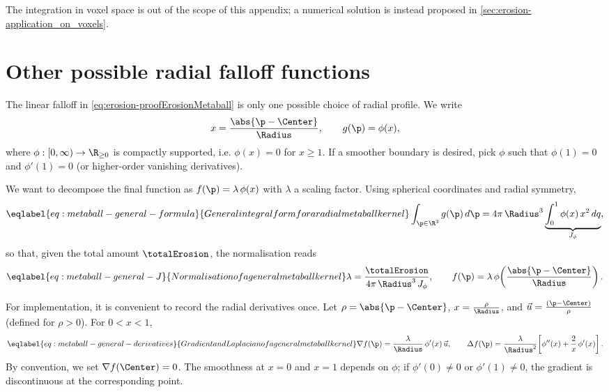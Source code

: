 The integration in voxel space is out of the scope of this appendix; a numerical solution is instead proposed in \cref{sec:erosion-application_on_voxels}.


\section{Other possible radial falloff functions}
\label{sec:erosion-appendix-other-falloffs}

The linear falloff in \cref{eq:erosion-proofErosionMetaball} is only one possible choice of radial profile. We write
\begin{align*}
    x = \frac{\abs{\p - \Center}}{\Radius}, \qquad
    g(\p) = \phi(x),
\end{align*}
where $\phi: [0,\infty) \to \R_{\ge 0}$ is compactly supported, i.e. $\phi(x) = 0$ for $x \ge 1$. If a smoother boundary is desired, pick $\phi$ such that $\phi(1) = 0$ and $\phi'(1) = 0$ (or higher-order vanishing derivatives).

We want to decompose the final function as $f(\p) = \lambda\,\phi(x)$ with $\lambda$ a scaling factor. Using spherical coordinates and radial symmetry,
\begin{align}
    \eqlabel{eq:metaball-general-formula}{General integral form for a radial metaball kernel}
    \int_{\p\in\R^3} g(\p)\,d\p
    = 4\pi\,\Radius^3 \underbrace{\int_{0}^{1} \phi(x)\,x^2\,dq}_{J_\phi},
\end{align}
so that, given the total amount $\totalErosion$, the normalisation reads
\begin{align}
    \eqlabel{eq:metaball-general-J}{Normalisation of a general metaball kernel}
    \lambda = \frac{\totalErosion}{4\pi\,\Radius^3\,J_\phi},
    \qquad
    f(\p) = \lambda\,\phi\!\left(\frac{\abs{\p - \Center}}{\Radius}\right).
\end{align}

For implementation, it is convenient to record the radial derivatives once. Let $\rho=\abs{\p - \Center}$, $x=\frac{\rho}{\Radius}$, and $\vec{u}=\frac{(\p-\Center)}{\rho}$ (defined for $\rho>0$). For $0<x<1$,
\begin{align}
    \eqlabel{eq:metaball-general-derivatives}{Gradient and Laplacian of a general metaball kernel}
    \nabla f(\p) = \frac{\lambda}{\Radius}\,\phi'(x)\,\vec{u},
    \qquad
    \Delta f(\p) = \frac{\lambda}{\Radius^2}\!\left[\phi''(x) + \frac{2}{x}\,\phi'(x)\right].
\end{align}
By convention, we set $\nabla f(\Center)=0$. The smoothness at $x=0$ and $x=1$ depends on $\phi$; if $\phi'(0)\neq 0$ or $\phi'(1)\neq 0$, the gradient is discontinuous at the corresponding point.

